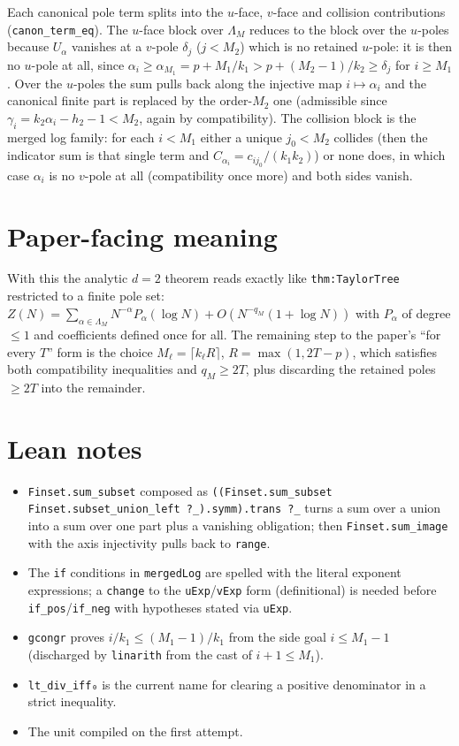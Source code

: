 \documentclass[11pt]{article}
\begin{document}
Each canonical pole term splits into the $u$-face, $v$-face and collision contributions
(\texttt{canon\_term\_eq}). The $u$-face block over $\Lambda_M$ reduces to the block over the
$u$-poles because $U_\alpha$ vanishes at a $v$-pole $\delta_j$ ($j<M_2$) which is no retained
$u$-pole: it is then no $u$-pole at all, since $\alpha_i\ge\alpha_{M_1}=p+M_1/k_1>p+(M_2-1)/k_2\ge\delta_j$
for $i\ge M_1$. Over the $u$-poles the sum pulls back along the injective map $i\mapsto\alpha_i$
and the canonical finite part is replaced by the order-$M_2$ one (admissible since
$\gamma_i=k_2\alpha_i-h_2-1<M_2$, again by compatibility). The collision block is the merged log
family: for each $i<M_1$ either a unique $j_0<M_2$ collides (then the indicator sum is that single
term and $C_{\alpha_i}=c_{ij_0}/(k_1k_2)$) or none does, in which case $\alpha_i$ is no $v$-pole at
all (compatibility once more) and both sides vanish.

\section{Paper-facing meaning}

With this the analytic $d=2$ theorem reads exactly like \texttt{thm:TaylorTree} restricted to a
finite pole set: $Z(N)=\sum_{\alpha\in\Lambda_M}N^{-\alpha}P_\alpha(\log N)+O(N^{-q_M}(1+\log N))$
with $P_\alpha$ of degree $\le1$ and coefficients defined once for all. The remaining step to the
paper's ``for every $T$'' form is the choice $M_\ell=\lceil k_\ell R\rceil$, $R=\max(1,2T-p)$, which
satisfies both compatibility inequalities and $q_M\ge2T$, plus discarding the retained poles
$\ge2T$ into the remainder.

\section{Lean notes}

\begin{itemize}
\item \texttt{Finset.sum\_subset} composed as
\texttt{((Finset.sum\_subset Finset.subset\_union\_left ?\_).symm).trans ?\_} turns a sum over a
union into a sum over one part plus a vanishing obligation; then \texttt{Finset.sum\_image} with the
axis injectivity pulls back to \texttt{range}.
\item The \texttt{if} conditions in \texttt{mergedLog} are spelled with the literal exponent
expressions; a \texttt{change} to the \texttt{uExp}/\texttt{vExp} form (definitional) is needed
before \texttt{if\_pos}/\texttt{if\_neg} with hypotheses stated via \texttt{uExp}.
\item \texttt{gcongr} proves $i/k_1\le(M_1-1)/k_1$ from the side goal $i\le M_1-1$ (discharged by
\texttt{linarith} from the cast of $i+1\le M_1$).
\item \texttt{lt\_div\_iff₀} is the current name for clearing a positive denominator in a strict
inequality.
\item The unit compiled on the first attempt.
\end{itemize}
\end{document}
